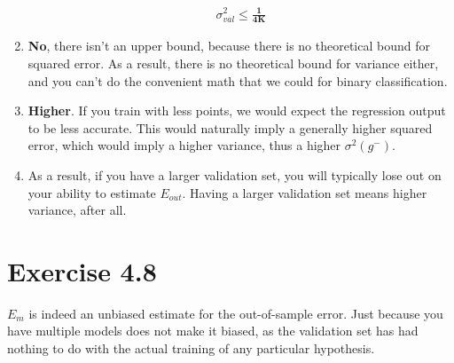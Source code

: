 \documentclass[12pt]{article}
\begin{document}
\begin{enumerate}[label=(\alph*)]
\begin{gather*}
		\sigma^2_{val} \le \boldsymbol{\frac{1}{4K}}
	\end{gather*}
	\item \textbf{No}, there isn't an upper bound, because there is no theoretical bound for squared error. As a result, there is no theoretical bound for variance either, and you can't do the convenient math that we could for binary classification.
	\item \textbf{Higher}. If you train with less points, we would expect the regression output to be less accurate. This would naturally imply a generally higher squared error, which would imply a higher variance, thus a higher $\sigma^2(g^-)$.
	\item As a result, if you have a larger validation set, you will typically lose out on your ability to estimate $E_{out}$. Having a larger validation set means higher variance, after all.
\end{enumerate}

\section*{Exercise 4.8}
$E_m$ is indeed an unbiased estimate for the out-of-sample error. Just because you have multiple models does not make it biased, as the validation set has had nothing to do with the actual training of any particular hypothesis.
\end{document}

